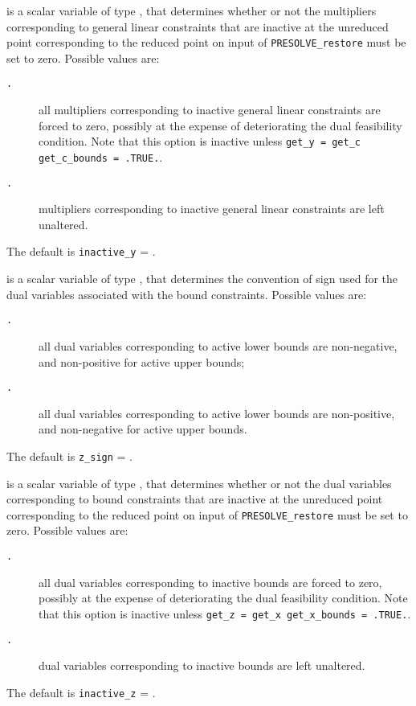 \documentclass{galahad}
\newcommand{\packagename}{PRESOLVE}
\newcommand{\sym}{\tt\small}
\begin{document}
\begin{description}
 is a scalar variable of type \integer, that
determines whether or not the multipliers corresponding
to general linear constraints that are inactive at the unreduced point
corresponding to the reduced point on input of {\tt \packagename\_restore}
must be set to zero. Possible values are:
\begin{description}
\item[\sym \galsymforcetozero.] all multipliers corresponding to inactive
                     general linear constraints are forced to zero,
                     possibly at the expense of deteriorating the
                     dual feasibility condition.
                     Note that this option is inactive unless
                     {\tt get\_y = get\_c get\_c\_bounds = .TRUE.}.
\item[\sym \galsymleaveasis.] multipliers corresponding to inactive
                   general linear constraints are left unaltered.
\end{description}
The default is {\tt inactive\_y} = {\sym \galsymleaveasis}.

is a scalar variable of type \integer, that
determines the convention of sign used for the dual
variables associated with the bound constraints. Possible values are:
\begin{description}
\item[\sym \galsympositive.] all dual variables corresponding to
                active lower bounds are non-negative, and
                non-positive for active upper bounds;
\item[\sym \galsymnegative.] all dual variables corresponding to
                active lower bounds are non-positive, and
               non-negative for active upper bounds.
\end{description}
The default is {\tt z\_sign} = {\sym \galsympositive}.

 is a scalar variable of type \integer, that
determines whether or not the dual variables corresponding
to bound constraints that are inactive at the unreduced point
corresponding to the reduced point on input of {\tt \packagename\_restore}
must be set to zero. Possible values are:
\begin{description}
\item[\sym \galsymforcetozero.] all dual variables corresponding to inactive
                     bounds are forced to zero,
                     possibly at the expense of deteriorating the
                     dual feasibility condition.
                     Note that this option is inactive unless
                     {\tt get\_z = get\_x get\_x\_bounds = .TRUE.}.
\item[\sym \galsymleaveasis.] dual variables corresponding to inactive
                   bounds are left unaltered.
\end{description}
The default is {\tt inactive\_z} = {\sym \galsymleaveasis}.


\end{description}
\end{document}
